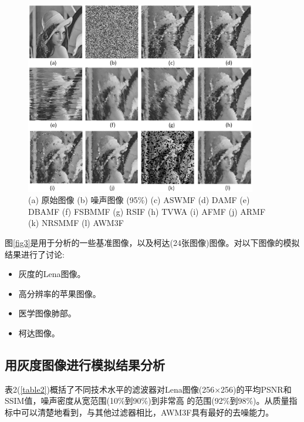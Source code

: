 \documentclass[12pt]{article} %
\begin{document}
\begin{figure}[H]
    \centering
    \includegraphics[width=0.9\textwidth]{images/06.eps}    
    \caption{(a) 原始图像 (b) 噪声图像 (95\%) (c) ASWMF (d) DAMF (e) DBAMF (f) FSBMMF (g) RSIF (h) TVWA (i) AFMF (j) ARMF (k) NRSMMF (l) AWM3F}
    \label{fig5}
\end{figure}

\newpage
图\ref{fig3}是用于分析的一些基准图像，以及柯达(24张图像)图像。对以下图像的模拟结果进行了讨论:
\begin{itemize}
    \item 灰度的Lena图像。
    \item 高分辨率的苹果图像。
    \item 医学图像肺部。
    \item 柯达图像。
\end{itemize}

\subsection{用灰度图像进行模拟结果分析}
表2(\ref{table2})概括了不同技术水平的滤波器对Lena图像(256×256)的平均PSNR和SSIM值，噪声密度从宽范围(10\%到90\%)到非常高
的范围(92\%到98\%)。从质量指标中可以清楚地看到，与其他过滤器相比，AWM3F\cite{ref23}具有最好的去噪能力。
\end{document}
